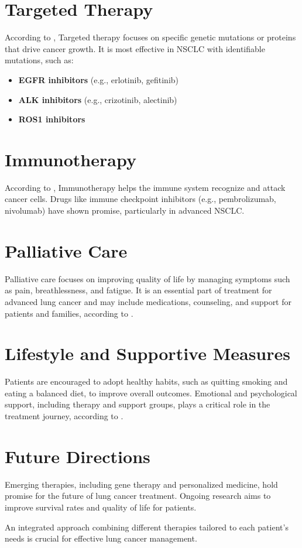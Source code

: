 \section{Targeted Therapy}
According to \cite{mayekar2017current}, Targeted therapy focuses on specific genetic mutations or proteins that drive cancer growth. It is most effective in NSCLC with identifiable mutations, such as:
\begin{itemize}
    \item \textbf{EGFR inhibitors} (e.g., erlotinib, gefitinib)
    \item \textbf{ALK inhibitors} (e.g., crizotinib, alectinib)
    \item \textbf{ROS1 inhibitors}
\end{itemize}

\section{Immunotherapy}
According to \cite{steven2016immunotherapy}, Immunotherapy helps the immune system recognize and attack cancer cells. Drugs like immune checkpoint inhibitors (e.g., pembrolizumab, nivolumab) have shown promise, particularly in advanced NSCLC.

\section{Palliative Care}
Palliative care focuses on improving quality of life by managing symptoms such as pain, breathlessness, and fatigue. It is an essential part of treatment for advanced lung cancer and may include medications, counseling, and support for patients and families, according to \cite{ferrell2011palliative}.

\section{Lifestyle and Supportive Measures}
Patients are encouraged to adopt healthy habits, such as quitting smoking and eating a balanced diet, to improve overall outcomes. Emotional and psychological support, including therapy and support groups, plays a critical role in the treatment journey, according to \cite{heredia2023effectiveness}.

\section{Future Directions}
Emerging therapies, including gene therapy and personalized medicine, hold promise for the future of lung cancer treatment. Ongoing research aims to improve survival rates and quality of life for patients.

An integrated approach combining different therapies tailored to each patient's needs is crucial for effective lung cancer management.